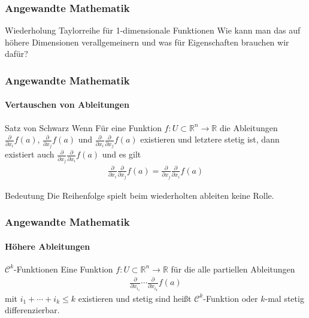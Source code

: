 \documentclass{beamer}
\begin{document}
\begin{frame}
    \frametitle{Angewandte Mathematik}


    \begin{block}{Wiederholung Taylorreihe für 1-dimensionale Funktionen}
        Wie kann man das auf höhere Dimensionen verallgemeinern und was für Eigenschaften brauchen wir dafür?
        \end{block}
\end{frame}


\begin{frame}
    \frametitle{Angewandte Mathematik}
\framesubtitle{Vertauschen von Ableitungen}
    \begin{block}{Satz von Schwarz}
Wenn Für eine Funktion $f:  U \subset \mathbb{R}^n \to \mathbb{R}$ die Ableitungen $\frac{\partial}{\partial x_i} f(a)$, $\frac{\partial}{\partial x_j}f(a)$ und $ \frac{\partial}{\partial x_i}\frac{\partial }{\partial x_j} f(a)$ existieren und letztere stetig ist, dann existiert auch $ \frac{\partial}{\partial x_j}\frac{\partial }{\partial x_i} f(a)$ und es gilt
\begin{align*}
\frac{\partial}{\partial x_i}\frac{\partial }{\partial x_j} f(a) = \frac{\partial}{\partial x_j}\frac{\partial }{\partial x_i} f(a)
\end{align*}
\end{block}
    \begin{block}{Bedeutung}
Die Reihenfolge spielt beim wiederholten ableiten keine Rolle.
\end{block}
 \end{frame}



\begin{frame}
    \frametitle{Angewandte Mathematik}
\framesubtitle{Höhere Ableitungen}
    \begin{block}{$\mathcal{C}^k$-Funktionen}
Eine  Funktion  $f: U \subset \mathbb{R}^n \to \mathbb{R}$ für die alle partiellen Ableitungen 
\begin{align*}
 \frac{\partial}{\partial x_{i_1}} \cdots   \frac{\partial}{\partial x_{i_k}} f(a)
\end{align*}
mit $i_1 + \cdots + i_k \leq k$ existieren und stetig sind heißt $\mathcal{C}^k$-Funktion oder $k$-mal stetig differenzierbar.
\end{block}
 \end{frame}
\end{document}
